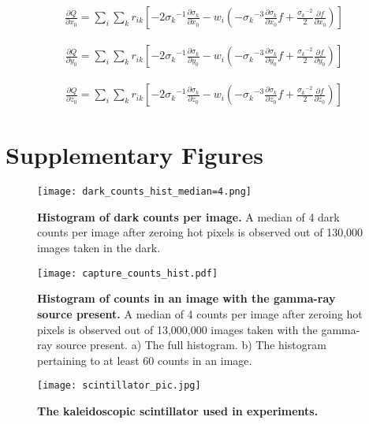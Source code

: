 \documentclass{article}
\begin{document}
\begin{align}
\frac{\partial Q}{\partial x_0} = \sum_i \sum_k r_{ik} \left[ -2{\sigma_k}^{-1}\frac{\partial \sigma_k}{\partial x_0} - w_i\left( -{\sigma_k}^{-3} \frac{\partial \sigma_k}{\partial x_0}f + \frac{{\sigma_k}^{-2}}{2} \frac{\partial f}{\partial x_0}  \right) \right] 
\end{align}

\begin{align}
\frac{\partial Q}{\partial y_0} = \sum_i \sum_k r_{ik} \left[ -2{\sigma_k}^{-1}\frac{\partial \sigma_k}{\partial y_0} - w_i\left( -{\sigma_k}^{-3} \frac{\partial \sigma_k}{\partial y_0}f + \frac{{\sigma_k}^{-2}}{2} \frac{\partial f}{\partial y_0}  \right) \right] 
\end{align}

\begin{align}
\frac{\partial Q}{\partial z_0} = \sum_i \sum_k r_{ik} \left[ -2{\sigma_k}^{-1}\frac{\partial \sigma_k}{\partial z_0} - w_i\left( -{\sigma_k}^{-3} \frac{\partial \sigma_k}{\partial z_0}f + \frac{{\sigma_k}^{-2}}{2} \frac{\partial f}{\partial z_0}  \right) \right] 
\end{align}


\section{Supplementary Figures}

\begin{figure}
\centering
\texttt{[image: dark\_counts\_hist\_median=4.png]}
\caption{\textbf{Histogram of dark counts per image.} A median of 4 dark counts 
per image after zeroing hot pixels is observed out of 130,000 images taken in the dark.} 
\label{fig:dark_counts_hist}
\end{figure}


\begin{figure}
\centering
\texttt{[image: capture\_counts\_hist.pdf]}
\caption{\textbf{Histogram of counts in an image with the gamma-ray source present.} A median of 4 counts 
per image after zeroing hot pixels is observed out of 13,000,000 images taken with 
the gamma-ray source present. 
a) The full histogram. 
b) The histogram pertaining to at least 60 counts in an image.} 
\label{fig:cap_counts_hist}
\end{figure}



\begin{figure}
\centering
\texttt{[image: scintillator\_pic.jpg]}
\caption{\textbf{The kaleidoscopic scintillator used in experiments.}}
\label{fig:scintillator}
\end{figure}
\end{document}
